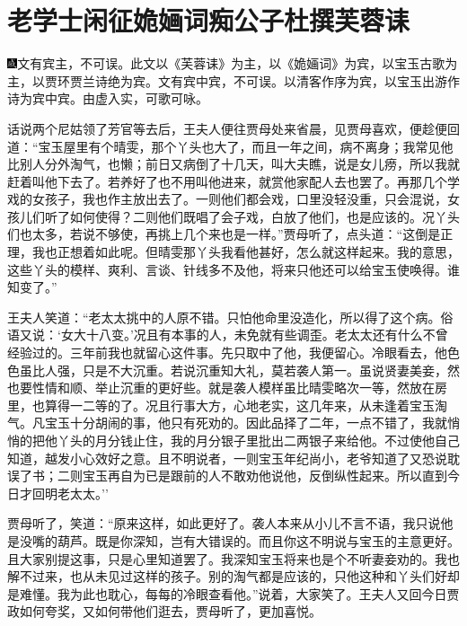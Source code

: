 
\chapter{老学士闲征姽婳词\hspace{.5em}痴公子杜撰芙蓉诔}
{\includegraphics[width=3mm]{../Images/00005}\kaishu 文有宾主，不可误。此文以《芙蓉诔》为主，以《}姽婳{\kaishu 词》为宾，以宝玉古歌为主，以贾环贾兰诗绝为宾。文有宾中宾，不可误。以清客作序为宾，以宝玉出游作诗为宾中宾。由虚入实，可歌可咏。}

话说两个尼姑领了芳官等去后，王夫人便往贾母处来省晨，见贾母喜欢，便趁便回道：``宝玉屋里有个晴雯，那个丫头也大了，而且一年之间，病不离身；我常见他比别人分外淘气，也懒；前日又病倒了十几天，叫大夫瞧，说是女儿痨，所以我就赶着叫他下去了。若养好了也不用叫他进来，就赏他家配人去也罢了。再那几个学戏的女孩子，我也作主放出去了。一则他们都会戏，口里没轻没重，只会混说，女孩儿们听了如何使得？二则他们既唱了会子戏，白放了他们，也是应该的。况丫头们也太多，若说不够使，再挑上几个来也是一样。''贾母听了，点头道：``这倒是正理，我也正想着如此呢。但晴雯那丫头我看他甚好，怎么就这样起来。我的意思，这些丫头的模样、爽利、言谈、针线多不及他，将来只他还可以给宝玉使唤得。谁知变了。''

王夫人笑道：``老太太挑中的人原不错。只怕他命里没造化，所以得了这个病。俗语又说：`女大十八变。'况且有本事的人，未免就有些调歪。老太太还有什么不曾经验过的。三年前我也就留心这件事。先只取中了他，我便留心。冷眼看去，他色色虽比人强，只是不大沉重。若说沉重知大礼，莫若袭人第一。虽说贤妻美妾，然也要性情和顺、举止沉重的更好些。就是袭人模样虽比晴雯略次一等，然放在房里，也算得一二等的了。况且行事大方，心地老实，这几年来，从未逢着宝玉淘气。凡宝玉十分胡闹的事，他只有死劝的。因此品择了二年，一点不错了，我就悄悄的把他丫头的月分钱止住，我的月分银子里批出二两银子来给他。不过使他自己知道，越发小心效好之意。且不明说者，一则宝玉年纪尚小，老爷知道了又恐说耽误了书；二则宝玉再自为已是跟前的人不敢劝他说他，反倒纵性起来。所以直到今日才回明老太太。''

贾母听了，笑道：``原来这样，如此更好了。袭人本来从小儿不言不语，我只说他是没嘴的葫芦。既是你深知，岂有大错误的。而且你这不明说与宝玉的主意更好。且大家别提这事，只是心里知道罢了。我深知宝玉将来也是个不听妻妾劝的。我也解不过来，也从未见过这样的孩子。别的淘气都是应该的，只他这种和丫头们好却是难懂。我为此也耽心，每每的冷眼查看他。''说着，大家笑了。王夫人又回今日贾政如何夸奖，又如何带他们逛去，贾母听了，更加喜悦。

